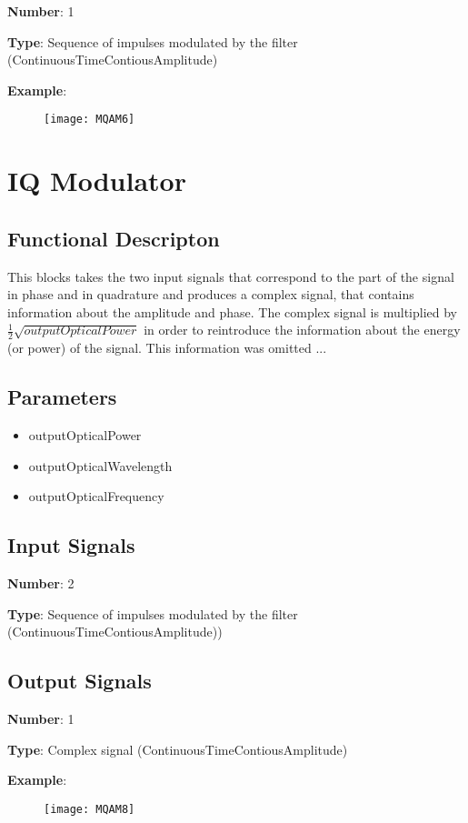 \documentclass[a4paper]{article}
\begin{document}
\textbf{Number}: 1

\textbf{Type}: Sequence of impulses modulated by the filter (ContinuousTimeContiousAmplitude)

\textbf{Example}:

\begin{figure}
	\texttt{[image: MQAM6]}
\end{figure}

\pagebreak

\section{IQ Modulator}

\subsection*{Functional Descripton}

This blocks takes the two input signals that correspond to the part of the signal in phase and in quadrature and produces a complex signal, that contains information about the amplitude and phase. The complex signal is multiplied by $\frac{1}{2}\sqrt{\textit{outputOpticalPower}}$ in order to reintroduce the information about the energy (or power) of the signal. This information was omitted ...

\subsection*{Parameters}

\begin{itemize}
	\item outputOpticalPower
	\item outputOpticalWavelength
	\item outputOpticalFrequency
\end{itemize}


\subsection*{Input Signals}

\textbf{Number}: 2

\textbf{Type}: Sequence of impulses modulated by the filter (ContinuousTimeContiousAmplitude))

\subsection*{Output Signals}

\textbf{Number}: 1

\textbf{Type}: Complex signal (ContinuousTimeContiousAmplitude)

\textbf{Example}:

\begin{figure}
	\texttt{[image: MQAM8]}
\end{figure}
\end{document}
